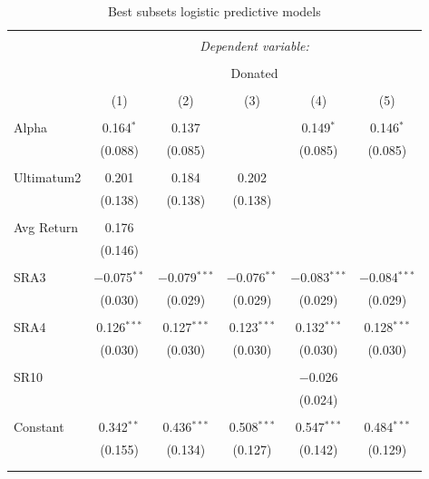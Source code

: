 \documentclass[12pt]{article}
\begin{document}
\begin{table}[!htbp] \centering 
  \caption{Best subsets logistic predictive models} 
  \label{} 
  \begin{adjustbox}{width=\textwidth}
\begin{tabular}{@{\extracolsep{5pt}}lccccc} 
\\[-1.8ex]\hline 
\hline \\[-1.8ex] 
 & \multicolumn{5}{c}{\textit{Dependent variable:}} \\ 
\cline{2-6} 
\\[-1.8ex] & \multicolumn{5}{c}{Donated} \\ 
\\[-1.8ex] & (1) & (2) & (3) & (4) & (5)\\ 
\hline \\[-1.8ex] 
 Alpha & 0.164$^{*}$ & 0.137 &  & 0.149$^{*}$ & 0.146$^{*}$ \\ 
  & (0.088) & (0.085) &  & (0.085) & (0.085) \\ 
  & & & & & \\ 
 Ultimatum2 & 0.201 & 0.184 & 0.202 &  &  \\ 
  & (0.138) & (0.138) & (0.138) &  &  \\ 
  & & & & & \\ 
 Avg Return & 0.176 &  &  &  &  \\ 
  & (0.146) &  &  &  &  \\ 
  & & & & & \\ 
 SRA3 & $-$0.075$^{**}$ & $-$0.079$^{***}$ & $-$0.076$^{**}$ & $-$0.083$^{***}$ & $-$0.084$^{***}$ \\ 
  & (0.030) & (0.029) & (0.029) & (0.029) & (0.029) \\ 
  & & & & & \\ 
 SRA4 & 0.126$^{***}$ & 0.127$^{***}$ & 0.123$^{***}$ & 0.132$^{***}$ & 0.128$^{***}$ \\ 
  & (0.030) & (0.030) & (0.030) & (0.030) & (0.030) \\ 
  & & & & & \\ 
 SR10 &  &  &  & $-$0.026 &  \\ 
  &  &  &  & (0.024) &  \\ 
  & & & & & \\ 
 Constant & 0.342$^{**}$ & 0.436$^{***}$ & 0.508$^{***}$ & 0.547$^{***}$ & 0.484$^{***}$ \\ 
  & (0.155) & (0.134) & (0.127) & (0.142) & (0.129) \\ 
  & & & & & \\ 
\hline \\[-1.8ex] 

\end{tabular}
\end{adjustbox}
\end{table}
\end{document}
